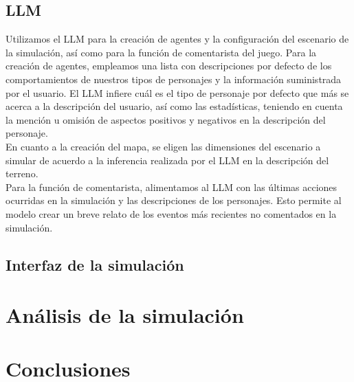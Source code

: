 \documentclass[11pt]{article}
\begin{document}
\subsection{LLM}
Utilizamos el LLM para la creación de agentes y la configuración del escenario de la simulación, así como para la función de comentarista del juego. Para la creación de agentes, empleamos una lista con descripciones por defecto de los comportamientos de nuestros tipos de personajes y la información suministrada por el usuario. El LLM infiere cuál es el tipo de personaje por defecto que más se acerca a la descripción del usuario, así como las estadísticas, teniendo en cuenta la mención u omisión de aspectos positivos y negativos en la descripción del personaje.
\\
En cuanto a la creación del mapa, se eligen las dimensiones del escenario a simular de acuerdo a la inferencia realizada por el LLM en la descripción del terreno.  \\
Para la función de comentarista, alimentamos al LLM con las últimas acciones ocurridas en la simulación y las descripciones de los personajes. Esto permite al modelo crear un breve relato de los eventos más recientes no comentados en la simulación.
\subsection{Interfaz de la simulación}

\section{Análisis de la simulación}
\section{Conclusiones}
\end{document}

